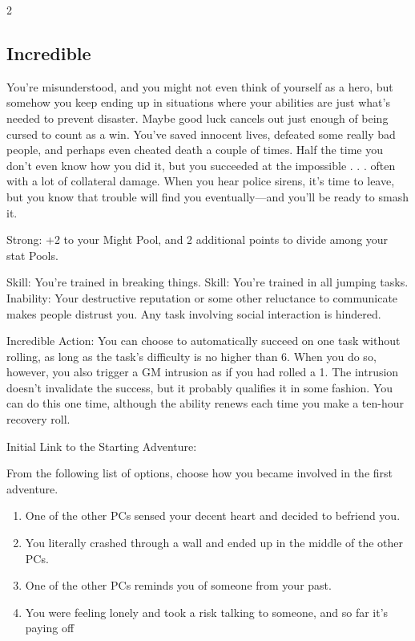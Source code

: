\begin{multicols}{2}
\subsection{Incredible}

You’re misunderstood, and you might not even think of yourself as a hero, but somehow you keep ending up in situations where your abilities are just what’s needed to prevent disaster. Maybe good luck cancels out just enough of being cursed to count as a win. You’ve saved innocent lives, defeated some really bad people, and perhaps even cheated death a couple of times. Half the time you don’t even know how you did it, but you succeeded at the impossible . . . often with a lot of collateral damage. When you hear police sirens, it’s time to leave, but you know that trouble will find you eventually—and you’ll be ready to smash it.

Strong: +2 to your Might Pool, and 2 additional points to divide among your stat Pools.

Skill: You’re trained in breaking things. Skill: You’re trained in all jumping tasks. Inability: Your destructive reputation or some other reluctance to communicate makes people distrust you. Any task involving social interaction is hindered.

Incredible Action: You can choose to automatically succeed on one task without rolling, as long as the task’s difficulty is no higher than 6. When you do so, however, you also trigger a GM intrusion as if you had rolled a 1. The intrusion doesn’t invalidate the success, but it probably qualifies it in some fashion. You can do this one time, although the ability renews each time you make a ten-hour recovery roll.

Initial Link to the Starting Adventure:

From the following list of options, choose how you became involved in the first adventure.

\begin{enumerate}
\item One of the other PCs sensed your decent heart and decided to befriend you.
\item You literally crashed through a wall and ended up in the middle of the other PCs.
\item One of the other PCs reminds you of someone from your past.
\item You were feeling lonely and took a risk talking to someone, and so far it’s paying off
\end{enumerate}


\end{multicols}
